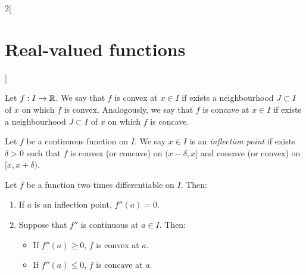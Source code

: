 \documentclass[../../../main.tex]{subfiles}
\begin{document}
\begin{multicols}{2}[\section{Real-valued functions}]
\begin{theorem}
    \end{theorem}
    \begin{definition}
        Let $f:I\rightarrow\mathbb{R}$. We say that $f$ is convex at $x\in I$ if exists a neighbourhood $J\subset I$ of $x$ on which $f$ is convex. Analogously, we say that $f$ is concave at $x\in I$ if exists a neighbourhood $J\subset I$ of $x$ on which $f$ is concave.
    \end{definition}
    \begin{definition}
        Let $f$ be a continuous function on $I$. We say $x\in I$ is an \textit{inflection point} if exists $\delta>0$ such that $f$ is convex (or concave) on $(x-\delta,x]$ and concave (or convex) on $[x,x+\delta)$.
    \end{definition}
    \begin{prop}
        Let $f$ be a function two times differentiable on $I$. Then:
        \begin{enumerate}
            \item If $a$ is an inflection point, $f''(a)=0$.
            \item Suppose that $f''$ is continuous at $a\in I$. Then:
                  \begin{itemize}
                      \item If $f''(a)\geq 0$, $f$ is convex at $a$.
                      \item If $f''(a)\leq 0$, $f$ is concave at $a$.
                  \end{itemize}
        \end{enumerate}
    \end{prop}

\end{multicols}
\end{document}
